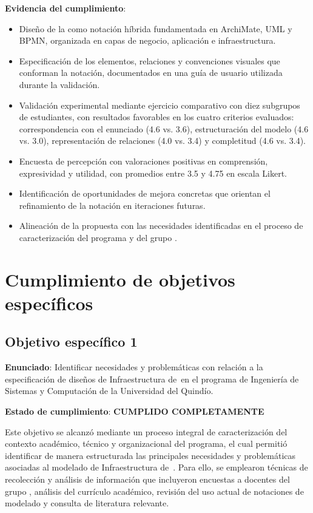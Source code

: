 \textbf{Evidencia del cumplimiento}:
\begin{itemize}
    \item Diseño de la \NDITI como notación híbrida fundamentada en ArchiMate, UML y BPMN, organizada en capas de negocio, aplicación e infraestructura.
    \item Especificación de los elementos, relaciones y convenciones visuales que conforman la notación, documentados en una guía de usuario utilizada durante la validación.
    \item Validación experimental mediante ejercicio comparativo con diez subgrupos de estudiantes, con resultados favorables en los cuatro criterios evaluados: correspondencia con el enunciado (4.6 vs. 3.6), estructuración del modelo (4.6 vs. 3.0), representación de relaciones (4.0 vs. 3.4) y completitud (4.6 vs. 3.4).
    \item Encuesta de percepción con valoraciones positivas en comprensión, expresividad y utilidad, con promedios entre 3.5 y 4.75 en escala Likert.
    \item Identificación de oportunidades de mejora concretas que orientan el refinamiento de la notación en iteraciones futuras.
    \item Alineación de la propuesta con las necesidades identificadas en el proceso de caracterización del programa y del grupo \GRID.
\end{itemize}

\section{Cumplimiento de objetivos específicos}
\noindent

\subsection{Objetivo específico 1}
\noindent

\textbf{Enunciado}: Identificar necesidades y problemáticas con relación a la especificación de diseños de Infraestructura de~\TI en el programa de Ingeniería de Sistemas y Computación de la Universidad del Quindío.

\textbf{Estado de cumplimiento}: \textbf{CUMPLIDO COMPLETAMENTE}

Este objetivo se alcanzó mediante un proceso integral de caracterización del contexto académico, técnico y organizacional del programa, el cual permitió identificar de manera estructurada las principales necesidades y problemáticas asociadas al modelado de Infraestructura de~\TI. Para ello, se emplearon técnicas de recolección y análisis de información que incluyeron encuestas a docentes del grupo \GRID, análisis del currículo académico, revisión del uso actual de notaciones de modelado y consulta de literatura relevante.

